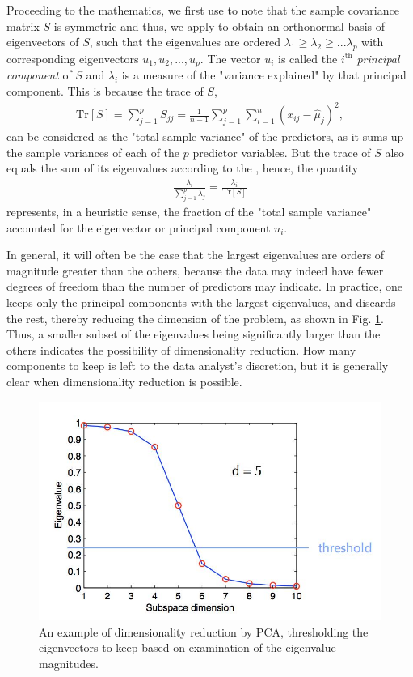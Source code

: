 \documentclass[12pt,letterpaper]{article}
\newcommand{\sumi}{{\sum_{i=1}^n}}
\providecommand{\tr}[1]{\text{Tr}\left[ #1 \right]}
\begin{document}
Proceeding to the mathematics, we first use  to note that the sample covariance matrix $S$ is  symmetric and thus, we apply  to obtain an orthonormal basis of eigenvectors of $S$, such that the eigenvalues are ordered $\lambda_1 \ge  \lambda_2\ge...\lambda_p$ with corresponding eigenvectors $u_1 , u_2, ... , u_p$.
%
The vector $u_i$ is called the $i^\text{th}$ \emph{principal component} of $S$ and $\lambda_i$ is a measure of the "variance explained" by that principal component. This is because the trace of $S$,
\begin{align}
\tr{S} = \sum_{j=1}^p S_{jj} = \frac{1}{n-1} \sum_{j=1}^p \sumi (x_{ij} - \hat \mu_j)^2,
\end{align}
can be considered as the "total sample variance" of the predictors, as it sums up the sample variances of each of the $p$ predictor variables. But the trace of $S$ also equals the sum of its eigenvalues according to the , hence, the quantity
\begin{align}
\frac{\lambda_i }{\sum_{j=1}^p\lambda_j}  = \frac{ \lambda_i }{ \tr{S}}
\end{align}
represents, in a heuristic sense, the fraction of the "total sample variance" accounted for  the eigenvector or principal component $u_i$.

In general, it will often be the case that the largest eigenvalues are orders of magnitude greater than the others, because the data may indeed have fewer degrees of freedom than the number of predictors may indicate. In practice, one keeps only the principal components with the largest eigenvalues, and discards the rest, thereby reducing the dimension of the problem, as shown in Fig. \ref{fig:examplePCA}. Thus, a smaller subset of the eigenvalues being significantly larger than the others indicates the possibility of dimensionality reduction. How many components to keep is left to the data analyst’s discretion, but it is generally clear when dimensionality reduction is possible.

\begin{figure}[ht!]
\centering
\includegraphics[scale=.5]{examplePCA.jpg}
\caption{An example of dimensionality reduction by PCA, thresholding the eigenvectors to keep based on examination of the eigenvalue magnitudes.} \label{fig:examplePCA}
\end{figure}
\end{document}
